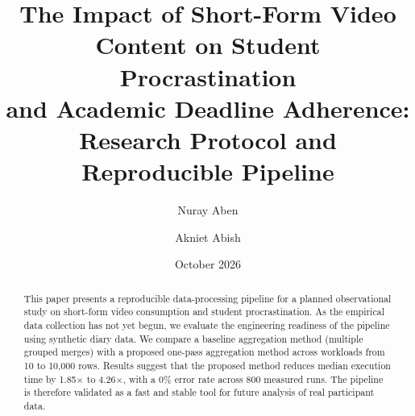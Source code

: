 \documentclass[11pt]{article}
\title{The Impact of Short-Form Video Content on Student Procrastination\\and Academic Deadline Adherence: Research Protocol and Reproducible Pipeline}
\author{Nuray Aben \and Akniet Abish}
\date{October 2026}
\begin{document}
\maketitle
\begin{abstract}
This paper presents a reproducible data-processing pipeline for a planned observational study on short-form video consumption and student procrastination. As the empirical data collection has not yet begun, we evaluate the engineering readiness of the pipeline using synthetic diary data. We compare a baseline aggregation method (multiple grouped merges) with a proposed one-pass aggregation method across workloads from 10 to 10,000 rows. Results suggest that the proposed method reduces median execution time by 1.85$\times$ to 4.26$\times$, with a 0\% error rate across 800 measured runs. The pipeline is therefore validated as a fast and stable tool for future analysis of real participant data.
\end{abstract}








\end{document}
